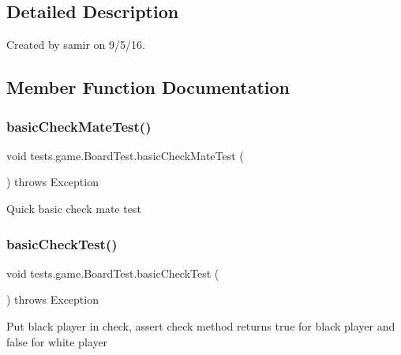 \subsection{Detailed Description}
Created by samir on 9/5/16. 

\subsection{Member Function Documentation}
\hypertarget{classtests_1_1game_1_1_board_test_a5c217ac733bd460abcff4389a1ae09b4}{}\label{classtests_1_1game_1_1_board_test_a5c217ac733bd460abcff4389a1ae09b4} 
\subsubsection{\texorpdfstring{basic\+Check\+Mate\+Test()}{basicCheckMateTest()}}
{\footnotesize\ttfamily void tests.\+game.\+Board\+Test.\+basic\+Check\+Mate\+Test (\begin{DoxyParamCaption}{ }\end{DoxyParamCaption}) throws Exception}

Quick basic check mate test \hypertarget{classtests_1_1game_1_1_board_test_a8362cde481d6f3dc37d1dcddc2bd9bd6}{}\label{classtests_1_1game_1_1_board_test_a8362cde481d6f3dc37d1dcddc2bd9bd6} 
\subsubsection{\texorpdfstring{basic\+Check\+Test()}{basicCheckTest()}}
{\footnotesize\ttfamily void tests.\+game.\+Board\+Test.\+basic\+Check\+Test (\begin{DoxyParamCaption}{ }\end{DoxyParamCaption}) throws Exception}

Put black player in check, assert check method returns true for black player and false for white player \hypertarget{classtests_1_1game_1_1_board_test_a6c94dc8abd281e03634c14adff394806}{}\label{classtests_1_1game_1_1_board_test_a6c94dc8abd281e03634c14adff394806} 
